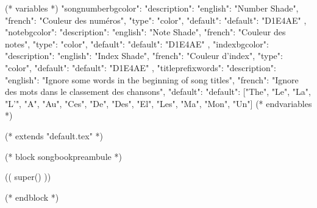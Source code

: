

(* variables *)
{
"songnumberbgcolor": {"description": {"english": "Number Shade", "french": "Couleur des numéros"},
                     "type": "color",
                     "default": {"default": "D1E4AE"}
                  },
"notebgcolor": {"description": {"english": "Note Shade", "french": "Couleur des notes"},
               "type": "color",
               "default": {"default": "D1E4AE"}
            },
"indexbgcolor": {"description": {"english": "Index Shade", "french": "Couleur d'index"},
               "type": "color",
               "default": {"default": "D1E4AE"}
            },
"titleprefixwords": {"description": {"english": "Ignore some words in the beginning of song titles",
                                     "french": "Ignore des mots dans le classement des chansons"},
                     "default": {"default": ["The", "Le", "La", "L'", "A", "Au", "Ces", "De",
                     						 "Des", "El", "Les", "Ma", "Mon", "Un"]}
                     }
}
(* endvariables *)

(* extends "default.tex" *)

(* block songbookpreambule *)
   \usepackage[
     a4paper %
     ,includeheadfoot %
     ,hmarginratio=1:1 %
     ,outer=1.8cm %
     ,vmarginratio=1:1 %
     ,bmargin=1.3cm %
     ]{geometry}

  (( super() ))

   \pagestyle{empty}


   \renewcommand{\snumbgcolor}{SongNumberBgColor}
   \renewcommand{\notebgcolor}{NoteBgColor}
   \renewcommand{\idxbgcolor}{IndexBgColor}
(* endblock *)
